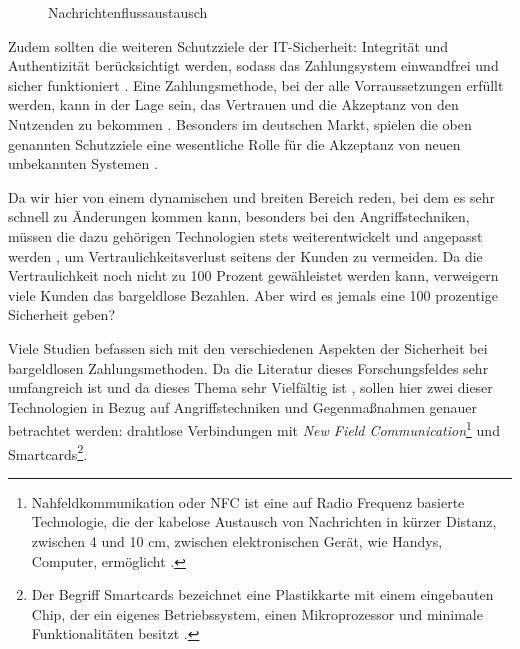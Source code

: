 \vfill
\begin{figure}[H]
    \caption{Nachrichtenflussaustausch \cite{refart:JTAS}}
    \label{fig:refart:JTAS_2}
\end{figure}

Zudem sollten die weiteren Schutzziele der IT-Sicherheit: Integrität und Authentizität berücksichtigt werden, 
sodass das Zahlungsystem einwandfrei und sicher funktioniert \cite{refip:GMPS}. Eine Zahlungsmethode, bei der 
alle Vorraussetzungen erfüllt werden, kann in der Lage sein, das Vertrauen und die Akzeptanz von den Nutzenden 
zu bekommen \cite{refart:HARE}. Besonders im deutschen Markt, spielen die oben genannten Schutzziele eine 
wesentliche Rolle für die Akzeptanz von neuen unbekannten Systemen \cite{refip:DKAM}.

Da wir hier von einem dynamischen und breiten Bereich reden, bei dem es sehr schnell zu Änderungen kommen kann, 
besonders bei den Angriffstechniken, müssen die dazu gehörigen Technologien stets weiterentwickelt und angepasst
werden \cite{refip:NYRS}, um Vertraulichkeitsverlust seitens der Kunden zu vermeiden. Da die Vertraulichkeit noch
nicht zu 100 Prozent gewähleistet werden kann, verweigern viele Kunden das bargeldlose Bezahlen. Aber
wird es jemals eine 100 prozentige Sicherheit geben?

Viele Studien befassen sich mit den verschiedenen Aspekten der Sicherheit bei bargeldlosen Zahlungsmethoden.
Da die Literatur dieses Forschungsfeldes sehr umfangreich ist und da dieses Thema sehr Vielfältig ist 
\cite{refip:GMPS}, sollen hier zwei dieser Technologien in Bezug auf Angriffstechniken und Gegenmaßnahmen 
genauer betrachtet werden: drahtlose Verbindungen mit \textit{New Field Communication}\footnote{Nahfeldkommunikation
oder NFC ist eine auf Radio Frequenz basierte Technologie, die der kabelose Austausch von Nachrichten in kürzer
Distanz, zwischen 4 und 10 cm, zwischen elektronischen Gerät, wie Handys, Computer, ermöglicht \cite{refart:NFNK}.} 
und Smartcards\footnote{Der Begriff Smartcards bezeichnet eine Plastikkarte mit einem eingebauten Chip, der ein
eigenes Betriebssystem, einen Mikroprozessor und minimale Funktionalitäten besitzt \cite{refip:JFSB}.}.



